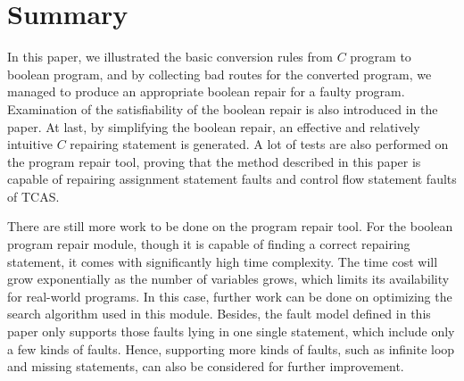 \section{Summary}
In this paper, we illustrated the basic conversion rules from $C$ program to boolean program,
and by collecting bad routes for the converted program, we managed to produce an appropriate boolean repair for a faulty program.
Examination of the satisfiability of the boolean repair is also introduced in the paper.
At last, by simplifying the boolean repair, an effective and relatively intuitive $C$ repairing statement is generated.
A lot of tests are also performed on the program repair tool, proving that the method described in this paper is capable of repairing assignment statement faults and control flow statement faults of TCAS.

There are still more work to be done on the program repair tool.
For the boolean program repair module, though it is capable of finding a correct repairing statement, it comes with significantly high time complexity.
The time cost will grow exponentially as the number of variables grows, which limits its availability for real-world programs.
In this case, further work can be done on optimizing the search algorithm used in this module.
Besides, the fault model defined in this paper only supports those faults lying in one single statement, which include only a few kinds of faults.
Hence, supporting more kinds of faults, such as infinite loop and missing statements, can also be considered for further improvement.
